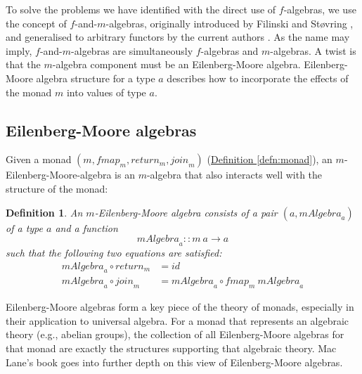 \documentclass{jfp1}
\newtheorem{definition}{Definition}
\newcommand{\defref}[1]{\hyperref[#1]{Definition \ref*{#1}}}
\begin{document}
To solve the problems we have identified with the direct use of
$f$-algebras, we use the concept of $f$-and-$m$-algebras, originally
introduced by Filinski and St\o{}vring \cite{filinski07inductive}, and
generalised to arbitrary functors by the current authors
\cite{atkey12fibrational}. As the name may imply, $f$-and-$m$-algebras
are simultaneously $f$-algebras and $m$-algebras. A twist is that the
$m$-algebra component must be an Eilenberg-Moore
algebra. Eilenberg-Moore algebra structure for a type $a$ describes
how to incorporate the effects of the monad $m$ into values of type
$a$.

\subsection{Eilenberg-Moore algebras}
\label{sec:eilenberg-moore-algebras}

Given a monad $(m, \mathit{fmap}_m, \mathit{return}_m,
\mathit{join}_m)$ (\defref{defn:monad}), an
$m$-Eilenberg-Moore-algebra is an $m$-algebra that also interacts well
with the structure of the monad:

\begin{definition}
  An \emph{$m$-Eilenberg-Moore algebra} consists of a pair
  $(a,\mathit{mAlgebra}_a)$ of a type $a$ and a function
  \begin{displaymath}
    \mathit{mAlgebra}_a :: m~a \to a
  \end{displaymath}
  such that the following two equations are satisfied:
  \begin{align}
    \label{eq:em-alg-return}
    \mathit{mAlgebra}_a \circ \mathit{return}_m & = \mathit{id} \\
    \label{eq:em-alg-join}
    \mathit{mAlgebra}_a \circ \mathit{join}_m & = \mathit{mAlgebra}_a \circ \mathit{fmap}_m~\mathit{mAlgebra}_a
  \end{align}
\end{definition}

Eilenberg-Moore algebras form a key piece of the theory of monads,
especially in their application to universal algebra. For a monad that
represents an algebraic theory (e.g., abelian groups), the collection
of all Eilenberg-Moore algebras for that monad are exactly the
structures supporting that algebraic theory. Mac Lane's book
\cite{maclane98} goes into further depth on this view of
Eilenberg-Moore algebras.
\end{document}
